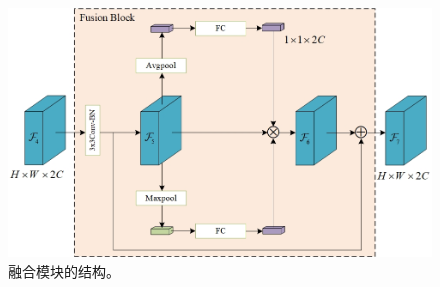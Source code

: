 \documentclass[a4paper]{ctexart}
\begin{document}
	\begin{figure}[h!]
		\centering 
		\includegraphics[width=0.7\columnwidth]{picture/LLIE/My Architecture/Fusion Block}
		\caption{
			\label{fig: Fusion Block} 
			融合模块的结构。
		}
	\end{figure}
	
%	
%	
	
\end{document}
